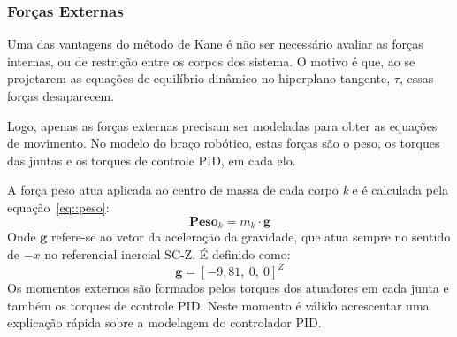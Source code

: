 
\bigskip {}

\medskip {}

\medskip {}

\medskip {}


\subsubsection{Forças Externas}

Uma das vantagens do método de Kane é não ser necessário avaliar as forças
internas, ou de restrição entre os corpos dos sistema. O motivo é que, ao se
projetarem as equações de equilíbrio dinâmico no hiperplano tangente, $\tau$,
essas forças desaparecem.

Logo, apenas as forças externas precisam ser modeladas para obter as equações de
movimento. No modelo do braço robótico, estas forças são o peso, os torques das
juntas e os torques de controle PID, em cada elo.

A força peso atua aplicada ao centro de massa de cada corpo \textit{k} e é calculada
pela equação~\ref{eq::peso}:
%
\begin{equation}
	\mathbf{Peso}_{k} = m_{k} \cdot \mathbf{g} \label{eq::peso}
\end{equation}
%
Onde $\mathbf{g}$ refere-se ao vetor da aceleração da gravidade, que atua sempre
no sentido de $-x$ no referencial inercial SC-Z. É definido como:
%
\begin{equation}
	\mathbf{g} = [-9,81,~0,~0]^{Z}
\end{equation}
%
Os momentos externos são formados pelos torques dos atuadores em cada junta e
também os torques de controle PID. Neste momento é válido acrescentar uma
explicação rápida sobre a modelagem do controlador PID.

